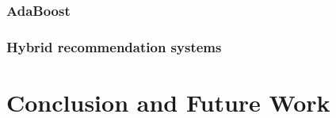 \documentclass[10pt]{reportMaster}
\begin{document}
\subsection{AdaBoost}

\subsection{Hybrid recommendation systems}





\chapter{Conclusion and Future Work}









\end{document}

